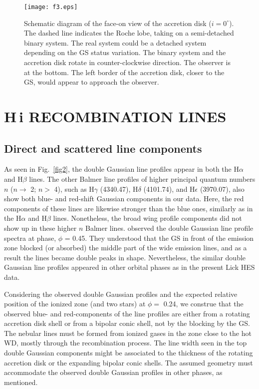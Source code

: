 \documentclass[a4paper,fleqn,usenatbib,useAMS]{mnras}
\def\eg{{\it e.g.,} }
\def\ha{H{$\alpha$}}
\def\hb{H{$\beta$}}
\def\hi{H\,{\sc i}}
\begin{document}
{%

\begin{figure}
\texttt{[image: f3.eps]}
\caption{Schematic diagram of the face-on view of the accretion disk
($i = 0^{\circ}$). The dashed line indicates the Roche lobe, taking on a semi-detached binary system. The real system could be a detached system depending on the GS status variation. The binary system and the accretion disk rotate in counter-clockwise direction. The observer is at the bottom. The left border of the accretion disk, closer to the GS, would appear to approach the observer.
}
\label{fig3}
\end{figure}

\section{{\hi} RECOMBINATION LINES}
\subsection{Direct and scattered line components}


As seen in Fig.~\ref{fig2}, the double Gaussian line profiles appear in both the {\ha} and {\hb} lines.  The other Balmer line profiles of higher principal quantum numbers $n$ ($n \rightarrow$ 2; $n >$ 4), such as H$\gamma$ (4340.47), H$\delta$ (4101.74), and H$\epsilon$ (3970.07), also show both blue- and red-shift Gaussian components in our data. Here, the red components of these lines are likewise stronger than the blue ones, similarly as in the {\ha} and {\hb} lines.
Nonetheless, the broad wing profile components did not show up in these higher $n$ Balmer lines. \citet{ike04} observed the double Gaussian line profile spectra at phase, $\phi$ = 0.45. They understood that the GS in front of the emission zone blocked (or absorbed) the middle part of the wide emission lines, and as a result the lines became double peaks in shape. Nevertheless, the similar double Gaussian line profiles appeared in other orbital phases as in the present Lick HES data.

Considering the observed double Gaussian profiles and the expected relative position of the ionized zone (and two stars) at $\phi =$ 0.24, we construe that the observed blue- and red-components of the line profiles are either from a rotating accretion disk shell or from a bipolar conic shell, not by the blocking by the GS. The nebular lines must be formed from ionized gases in the zone close to the hot WD, mostly through the recombination process.
The line width seen in the top double Gaussian components might be associated to the thickness of the rotating accretion disk or the expanding bipolar conic shells.
The assumed geometry must accommodate the observed double Gaussian profiles in other phases, as mentioned.


}
\end{document}
